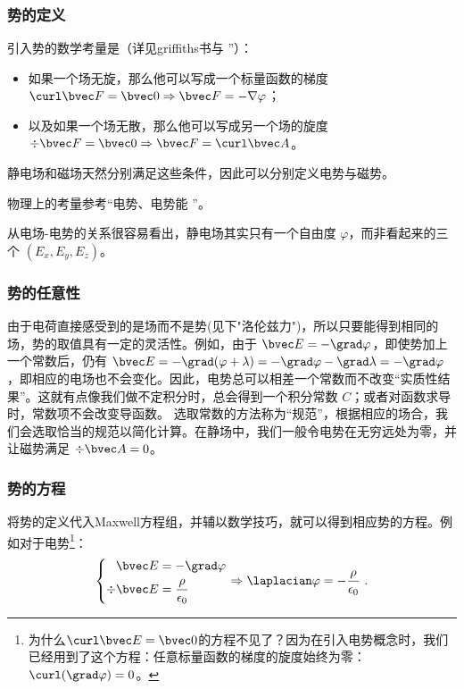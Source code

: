 \subsubsection{势的定义}
引入势的数学考量是（详见griffiths书与 ”）：
\begin{itemize}
\item 如果一个场无旋，那么他可以写成一个标量函数的梯度 $\curl \bvec F = \bvec 0 \Rightarrow \bvec F = - \nabla \varphi$；
\item 以及如果一个场无散，那么他可以写成另一个场的旋度$\div \bvec F = \bvec 0 \Rightarrow \bvec F = \curl \bvec A$。
\end{itemize}
静电场和磁场天然分别满足这些条件，因此可以分别定义电势与磁势。

物理上的考量参考“电势、电势能 ”。

从电场-电势的关系很容易看出，静电场其实只有一个自由度 $\varphi$，而非看起来的三个 $(E_x, E_y, E_z)$。

\subsubsection{势的任意性}
由于电荷直接感受到的是场而不是势(见下"洛伦兹力")，所以只要能得到相同的场，势的取值具有一定的灵活性。例如，由于 $\bvec E = -\grad \varphi$，即使势加上一个常数后，仍有 $\bvec E = -\grad (\varphi+\lambda) = -\grad \varphi - \grad \lambda = -\grad \varphi$，即相应的电场也不会变化。因此，电势总可以相差一个常数而不改变“实质性结果”。这就有点像我们做不定积分时，总会得到一个积分常数 $C$；或者对函数求导时，常数项不会改变导函数。
选取常数的方法称为“规范”，根据相应的场合，我们会选取恰当的规范以简化计算。在静场中，我们一般令电势在无穷远处为零，并让磁势满足 $\div \bvec A = 0$。

\subsubsection{势的方程}
将势的定义代入Maxwell方程组，并辅以数学技巧，就可以得到相应势的方程。例如对于电势\footnote{为什么$\curl \bvec E = \bvec 0$的方程不见了？因为在引入电势概念时，我们已经用到了这个方程：任意标量函数的梯度的旋度始终为零：$\curl (\grad \varphi) = 0$。}：
$$
\left \{
\begin{aligned}
\bvec E &= -\grad \varphi\\
\div \bvec E &= \frac{\rho}{\epsilon_0}\\
\end{aligned}
\right.
\Rightarrow
\laplacian \varphi = -\frac{\rho}{\epsilon_0}
~.
$$

